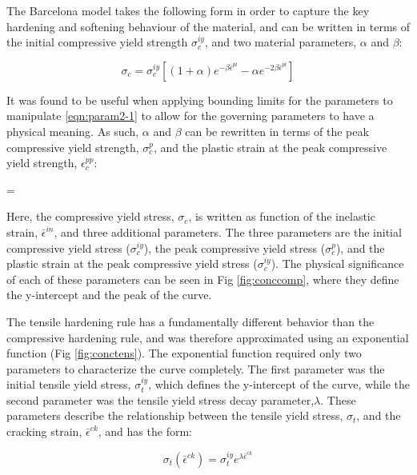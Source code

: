 The Barcelona model takes the following form in order to capture the key hardening and softening behaviour of the material, and can be written in terms of the initial compressive yield strength $\sigma_c^{iy}$, and two material parameters, $\alpha$ and $\beta$:

\begin{equation}
\sigma_c=\sigma_c^{iy}\left [ \left ( 1+\alpha \right ) e^{-\beta\bar{\epsilon}^{pl}}-\alpha e^{-2\beta\bar{\epsilon}^{pl}}  \right ]
\label{eqn:param2-1}
\end{equation}

It was found to be useful when applying bounding limits for the parameters to manipulate \ref{eqn:param2-1} to allow for the governing parameters to have a physical meaning. As such, $\alpha$ and $\beta$ can be rewritten in terms of the peak compressive yield strength, $\sigma_{c}^{p}$, and the plastic strain at the peak compressive yield strength, $\epsilon_c^{pp}$:

\beta=

Here, the compressive yield stress, $\sigma_{c}$, is written as function
of the inelastic strain, $\bar{\epsilon}^{in}$, and three additional
parameters. The three parameters are the initial compressive yield
stress ($\sigma_{c}^{iy}$), the peak compressive yield stress ($\sigma_{c}^{p}$),
and the plastic strain at the peak compressive yield stress ($\sigma_{c}^{iy}$).
The physical significance of each of these parameters can be seen
in Fig \ref{fig:conccomp}, where they define the y-intercept and the peak of the curve.

The tensile hardening rule has a fundamentally different behavior
than the compressive hardening rule, and was therefore approximated
using an exponential function (Fig \ref{fig:conctens}). The exponential function required
only two parameters to characterize the curve completely. The first
parameter was the initial tensile yield stress, $\sigma_{t}^{iy}$,
which defines the y-intercept of the curve, while the second parameter
was the tensile yield stress decay parameter,$\lambda$. These parameters
describe the relationship between the tensile yield stress, $\sigma_{t}$,
and the cracking strain, $\bar{\epsilon}^{ck}$, and has the form:

\begin{equation}
\sigma_{t}\left(\bar{\epsilon}^{ck}\right)=\sigma_{t}^{iy}e^{\lambda\bar{\epsilon}^{ck}}\label{eqn:param2}
\end{equation}


